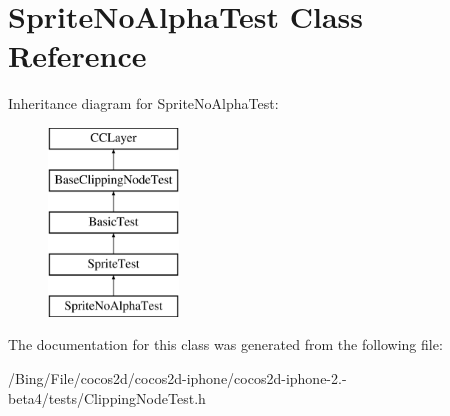 \hypertarget{interface_sprite_no_alpha_test}{\section{Sprite\-No\-Alpha\-Test Class Reference}
\label{interface_sprite_no_alpha_test}
}
Inheritance diagram for Sprite\-No\-Alpha\-Test\-:\begin{figure}[H]
\begin{center}
\leavevmode
\includegraphics[height=5.000000cm]{interface_sprite_no_alpha_test}
\end{center}
\end{figure}


The documentation for this class was generated from the following file\-:\begin{DoxyCompactItemize}
\item 
/\-Bing/\-File/cocos2d/cocos2d-\/iphone/cocos2d-\/iphone-\/2.-\/beta4/tests/Clipping\-Node\-Test.\-h\end{DoxyCompactItemize}
